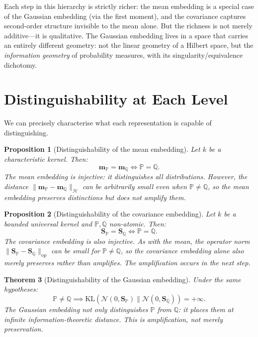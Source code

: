 \documentclass[12pt, oneside]{book}
\theoremstyle{plain}
\newtheorem{theorem}{Theorem}[chapter]
\newtheorem{proposition}[theorem]{Proposition}
\theoremstyle{definition}
\newcommand{\calH}{\mathcal{H}}
\newcommand{\calN}{\mathcal{N}}
\newcommand{\PP}{\mathbb{P}}
\newcommand{\QQ}{\mathbb{Q}}
\newcommand{\op}{\mathrm{op}}
\newcommand{\mP}{\mathbf{m}_{\PP}}
\newcommand{\mQ}{\mathbf{m}_{\QQ}}
\newcommand{\SP}{\mathbf{S}_{\PP}}
\newcommand{\SQ}{\mathbf{S}_{\QQ}}
\newcommand{\KL}{\mathrm{KL}}
\begin{document}
Each step in this hierarchy is strictly richer: the mean embedding is a special case of the Gaussian embedding (via the first moment), and the covariance captures second-order structure invisible to the mean alone. But the richness is not merely additive---it is qualitative. The Gaussian embedding lives in a space that carries an entirely different geometry: not the linear geometry of a Hilbert space, but the \emph{information geometry} of probability measures, with its singularity/equivalence dichotomy.

\section{Distinguishability at Each Level}

We can precisely characterise what each representation is capable of distinguishing.

\begin{proposition}[Distinguishability of the mean embedding]
\label{prop:mean_distinguish}
Let $k$ be a characteristic kernel. Then:
\begin{equation}
\mP = \mQ \iff \PP = \QQ.
\end{equation}
The mean embedding is injective: it distinguishes all distributions. However, the distance $\|\mP - \mQ\|_{\calH}$ can be arbitrarily small even when $\PP \neq \QQ$, so the mean embedding \emph{preserves} distinctions but does not amplify them.
\end{proposition}

\begin{proposition}[Distinguishability of the covariance embedding]
\label{prop:cov_distinguish}
Let $k$ be a bounded universal kernel and $\PP, \QQ$ non-atomic. Then:
\begin{equation}
\SP = \SQ \iff \PP = \QQ.
\end{equation}
The covariance embedding is also injective. As with the mean, the operator norm $\|\SP - \SQ\|_{\op}$ can be small for $\PP \neq \QQ$, so the covariance embedding alone also merely preserves rather than amplifies. The amplification occurs in the next step.
\end{proposition}

\begin{theorem}[Distinguishability of the Gaussian embedding]
\label{thm:gaussian_distinguish}
Under the same hypotheses:
\begin{equation}
\PP \neq \QQ \implies \KL(\calN(0, \SP) \| \calN(0, \SQ)) = +\infty.
\end{equation}
The Gaussian embedding not only distinguishes $\PP$ from $\QQ$: it places them at \emph{infinite} information-theoretic distance. This is amplification, not merely preservation.
\end{theorem}
\end{document}
